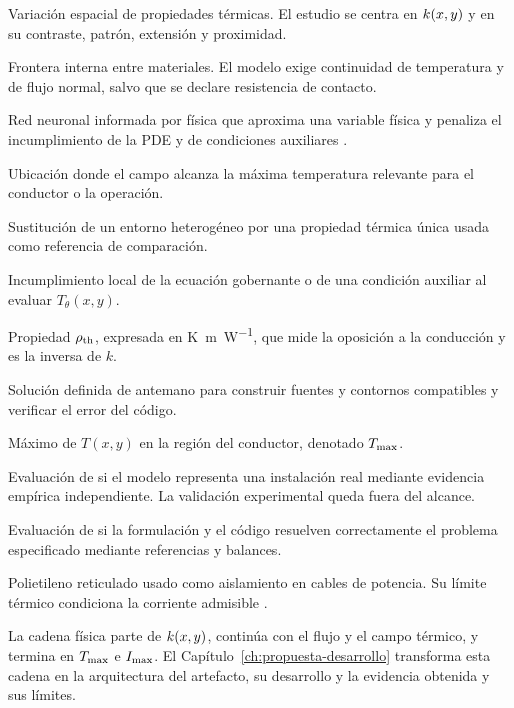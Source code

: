 \begin{description}[style=nextline,itemsep=0.5\baselineskip]
  \item[Heterogeneidad térmica.] Variación espacial de propiedades térmicas. El estudio se centra en $k(x,y)$ y en su contraste, patrón, extensión y proximidad.

  \item[Interfaz térmica.] Frontera interna entre materiales. El modelo exige continuidad de temperatura y de flujo normal, salvo que se declare resistencia de contacto.

  \item[PINN.] Red neuronal informada por física que aproxima una variable física y penaliza el incumplimiento de la PDE y de condiciones auxiliares \parencite{raissi2019}.

  \item[Punto caliente.] Ubicación donde el campo alcanza la máxima temperatura relevante para el conductor o la operación.

  \item[Representación homogénea equivalente.] Sustitución de un entorno heterogéneo por una propiedad térmica única usada como referencia de comparación.

  \item[Residuo físico.] Incumplimiento local de la ecuación gobernante o de una condición auxiliar al evaluar $T_\theta(x,y)$.

  \item[Resistividad térmica.] Propiedad $\rho_{\mathrm{th}}$, expresada en \si{\kelvin\metre\per\watt}, que mide la oposición a la conducción y es la inversa de $k$.

  \item[Solución manufacturada.] Solución definida de antemano para construir fuentes y contornos compatibles y verificar el error del código.

  \item[Temperatura máxima del conductor.] Máximo de $T(x,y)$ en la región del conductor, denotado $T_{\max}$.

  \item[Validación.] Evaluación de si el modelo representa una instalación real mediante evidencia empírica independiente. La validación experimental queda fuera del alcance.

  \item[Verificación.] Evaluación de si la formulación y el código resuelven correctamente el problema especificado mediante referencias y balances.

  \item[XLPE.] Polietileno reticulado usado como aislamiento en cables de potencia. Su límite térmico condiciona la corriente admisible \parencite{iec60502_2_2014}.
\end{description}

La cadena física parte de $k(x,y)$, continúa con el flujo y el campo térmico, y termina en $T_{\max}$ e $I_{\max}$. El Capítulo~\ref{ch:propuesta-desarrollo} transforma esta cadena en la arquitectura del artefacto, su desarrollo y la evidencia obtenida y sus límites.


